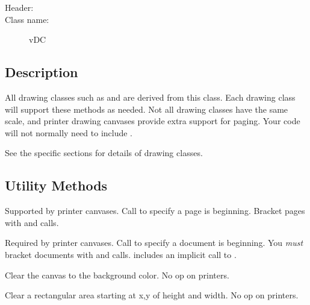 \begin{description}
	\item [Header:] 
	\item [Class name:] vDC
\end{description}

\subsection* {Description}

All drawing classes such as  and 
are derived from this class. Each drawing class will support
these methods as needed. Not all drawing classes have the same
scale, and printer drawing canvases provide extra support for
paging. Your code will not normally need to include .

See the specific sections for details of drawing classes.

\subsection* {Utility Methods}


Supported by printer canvases. Call to specify a page is
beginning. Bracket pages with  and 
calls.


Required by printer canvases. Call to specify a document is
beginning. You \emph{must} bracket documents with 
and  calls.  includes an
implicit call to .


Clear the canvas to the background color. No op on printers.


Clear a rectangular area starting at x,y of height and width. No
op on printers.

 
